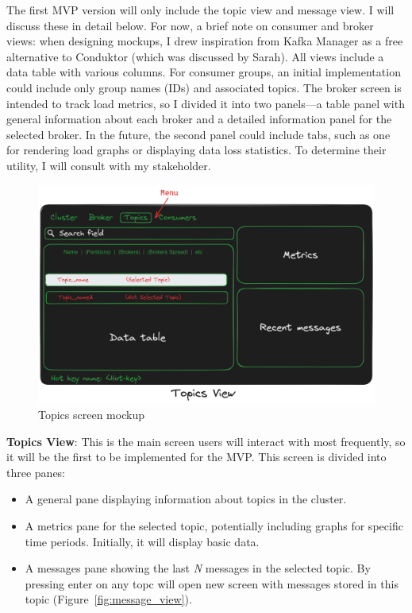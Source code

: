 \documentclass[10pt , a4paper]{report}
\begin{document}
The first MVP version will only include the topic view and message view. I will discuss these in detail below. For now, a brief note on consumer and broker views: when designing mockups, I drew inspiration from Kafka Manager as a free alternative to Conduktor (which was discussed by Sarah). All views include a data table with various columns. For consumer groups, an initial implementation could include only group names (IDs) and associated topics. The broker screen is intended to track load metrics, so I divided it into two panels—a table panel with general information about each broker and a detailed information panel for the selected broker. In the future, the second panel could include tabs, such as one for rendering load graphs or displaying data loss statistics. To determine their utility, I will consult with my stakeholder.

\begin{figure}[htbp]
    \centering
    \includegraphics[width=.8\linewidth]{imgs/TopicsScreenDesign.png}
    \caption{Topics screen mockup}
    \label{fig:topics_screen_maquette}
\end{figure}

\textbf{Topics View}: This is the main screen users will interact with most frequently, so it will be the first to be implemented for the MVP. This screen is divided into three panes:
\begin{itemize}
    \item A general pane displaying information about topics in the cluster.
    \item A metrics pane for the selected topic, potentially including graphs for specific time periods. Initially, it will display basic data.
    \item A messages pane showing the last \textit{N} messages in the selected topic. By pressing enter on any topc will open new screen with messages stored in this topic (Figure~\ref{fig:message_view}).
\end{itemize}
\end{document}
